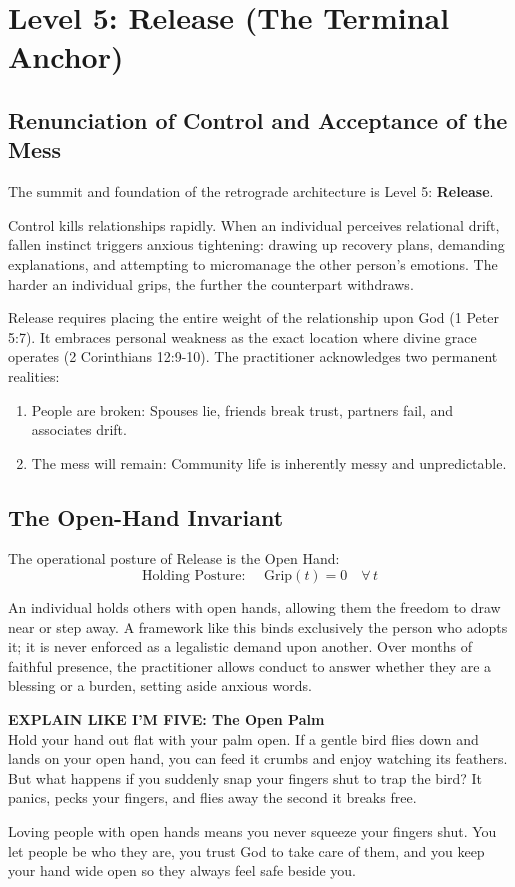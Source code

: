 \documentclass[11pt,twocolumn]{article}
\begin{document}
\section{Level 5: Release (The Terminal Anchor)}

\subsection{Renunciation of Control and Acceptance of the Mess}
The summit and foundation of the retrograde architecture is Level 5: \textbf{Release}. 

Control kills relationships rapidly. When an individual perceives relational drift, fallen instinct triggers anxious tightening: drawing up recovery plans, demanding explanations, and attempting to micromanage the other person's emotions. The harder an individual grips, the further the counterpart withdraws.

Release requires placing the entire weight of the relationship upon God (1 Peter 5:7). It embraces personal weakness as the exact location where divine grace operates (2 Corinthians 12:9-10). The practitioner acknowledges two permanent realities:
\begin{enumerate}
    \item People are broken: Spouses lie, friends break trust, partners fail, and associates drift.
    \item The mess will remain: Community life is inherently messy and unpredictable.
\end{enumerate}

\subsection{The Open-Hand Invariant}
The operational posture of Release is the Open Hand:
\begin{equation}
\text{Holding Posture: } \quad \text{Grip}(t) = 0 \quad \forall \, t
\end{equation}

An individual holds others with open hands, allowing them the freedom to draw near or step away. A framework like this binds exclusively the person who adopts it; it is never enforced as a legalistic demand upon another. Over months of faithful presence, the practitioner allows conduct to answer whether they are a blessing or a burden, setting aside anxious words.

\begin{eli5box}
\textbf{EXPLAIN LIKE I'M FIVE: The Open Palm}\\
Hold your hand out flat with your palm open. If a gentle bird flies down and lands on your open hand, you can feed it crumbs and enjoy watching its feathers. But what happens if you suddenly snap your fingers shut to trap the bird? It panics, pecks your fingers, and flies away the second it breaks free. 

Loving people with open hands means you never squeeze your fingers shut. You let people be who they are, you trust God to take care of them, and you keep your hand wide open so they always feel safe beside you.
\end{eli5box}
\end{document}
